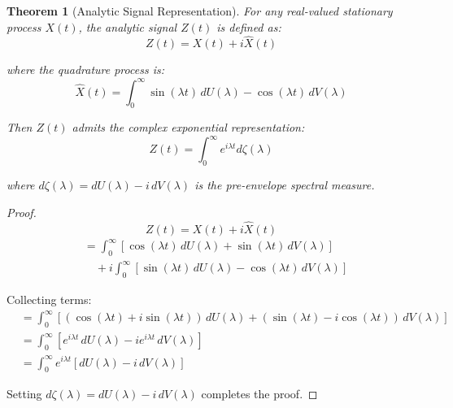 \documentclass[11pt]{article}
\newtheorem{theorem}{Theorem}[section]
\begin{document}
\begin{theorem}[Analytic Signal Representation]
\label{thm:analytic_signal}
For any real-valued stationary process $X(t)$, the analytic signal $Z(t)$ is defined as:
\begin{equation}
\label{eq:analytic_signal_def}
Z(t) = X(t) + i\hat{X}(t)
\end{equation}

where the quadrature process is:
\begin{equation}
\label{eq:quadrature_process}
\hat{X}(t) = \int_0^{\infty} \sin(\lambda t) \, dU(\lambda) - \cos(\lambda t) \, dV(\lambda)
\end{equation}

Then $Z(t)$ admits the complex exponential representation:
\begin{equation}
\label{eq:complex_exponential_rep}
Z(t) = \int_0^{\infty} e^{i\lambda t} d\zeta(\lambda)
\end{equation}

where $d\zeta(\lambda) = dU(\lambda) - i \, dV(\lambda)$ is the pre-envelope spectral measure.
\end{theorem}

\begin{proof}
\begin{equation}
\label{eq:analytic_proof_step1}
Z(t) = X(t) + i\hat{X}(t)
\end{equation}
\begin{align}
\label{eq:analytic_proof_step2}
&= \int_0^{\infty} [\cos(\lambda t) \, dU(\lambda) + \sin(\lambda t) \, dV(\lambda)] \nonumber \\
&\quad + i\int_0^{\infty} [\sin(\lambda t) \, dU(\lambda) - \cos(\lambda t) \, dV(\lambda)]
\end{align}

Collecting terms:
\begin{align}
\label{eq:analytic_proof_step3}
&= \int_0^{\infty} [(\cos(\lambda t) + i\sin(\lambda t)) \, dU(\lambda) + (\sin(\lambda t) - i\cos(\lambda t)) \, dV(\lambda)] \nonumber \\
&= \int_0^{\infty} [e^{i\lambda t} \, dU(\lambda) - ie^{i\lambda t} \, dV(\lambda)] \nonumber \\
&= \int_0^{\infty} e^{i\lambda t} [dU(\lambda) - i \, dV(\lambda)]
\end{align}

Setting $d\zeta(\lambda) = dU(\lambda) - i \, dV(\lambda)$ completes the proof.
\end{proof}
\end{document}
